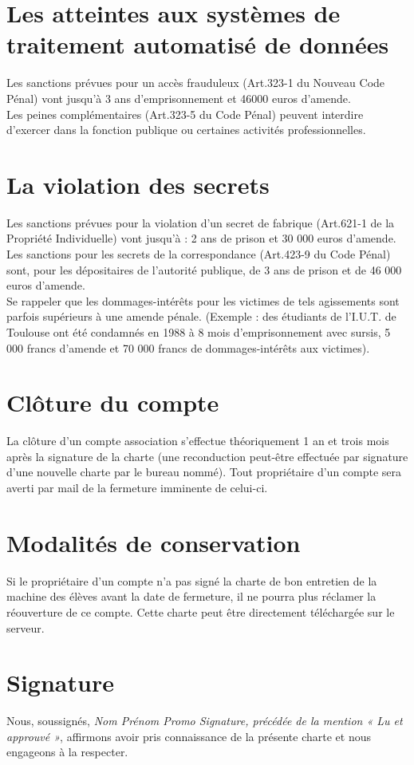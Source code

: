 \documentclass[10pt,a4paper]{article}
\begin{document}
\section{Les atteintes aux systèmes de traitement automatisé de données}
Les sanctions prévues pour un accès frauduleux (Art.323-1 du Nouveau Code Pénal) vont jusqu'à 3 ans d'emprisonnement et 46000 euros d'amende.\\
Les peines complémentaires (Art.323-5 du Code Pénal) peuvent interdire d'exercer dans la fonction publique ou certaines activités professionnelles.

\section{La violation des secrets}
Les sanctions prévues pour la violation d'un secret de fabrique (Art.621-1 de la Propriété Individuelle) vont jusqu'à : 2 ans de prison et 30 000 euros d'amende. Les sanctions pour les secrets de la correspondance (Art.423-9 du Code Pénal) sont, pour les dépositaires de l'autorité publique, de 3 ans de prison et de 46 000 euros d'amende.\\

Se rappeler que les dommages-intérêts pour les victimes de tels agissements sont parfois supérieurs à une amende pénale. (Exemple : des étudiants de l'I.U.T. de Toulouse ont été condamnés en 1988 à 8 mois d'emprisonnement avec sursis, 5 000 francs d'amende et 70 000 francs de dommages-intérêts aux victimes).

\section{Clôture du compte}
La clôture d'un compte association s'effectue théoriquement 1 an et trois mois après la signature de la charte (une reconduction peut-être effectuée par signature d'une nouvelle charte par le bureau nommé). Tout propriétaire d'un compte sera averti par mail de la fermeture imminente de celui-ci.

\section{Modalités de conservation}
Si le propriétaire d'un compte n'a pas signé la charte de bon entretien de la machine des élèves avant la date de fermeture, il ne pourra plus réclamer la réouverture de ce compte. Cette charte peut être directement téléchargée sur le serveur.

\section{Signature}
Nous, soussignés, \textit{Nom Prénom Promo Signature, précédée de la mention « Lu et approuvé »}, affirmons avoir pris connaissance de la présente charte et nous engageons à la respecter.
\end{document}
